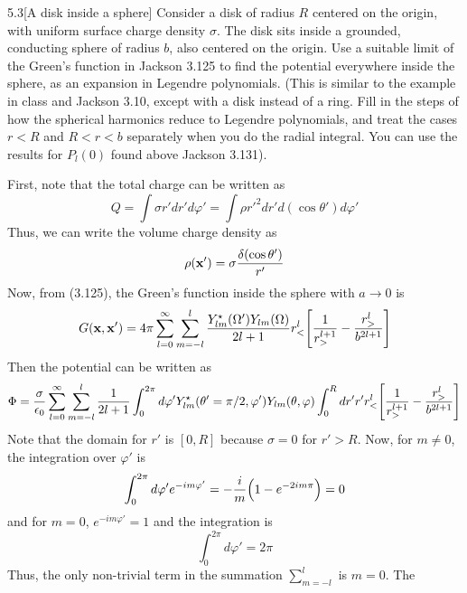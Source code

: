 \documentclass[12pt]{article}
\begin{document}
\begin{problem}{5.3}[A disk inside a sphere]
Consider a disk of radius $R$ centered on the origin, with uniform surface
charge density $\sigma$. The disk sits inside a grounded, conducting sphere of
radius $b$, also centered on the origin. Use a suitable limit of the Green's
function in Jackson 3.125 to find the potential everywhere inside the sphere, as
an expansion in Legendre polynomials. (This is similar to the example in class
and Jackson 3.10, except with a disk instead of a ring. Fill in the steps of how
the spherical harmonics reduce to Legendre polynomials, and treat the cases
$r<R$ and $R<r<b$ separately when you do the radial integral. You can use the
results for $P_l(0)$ found above Jackson 3.131).
\begin{solution}
First, note that the total charge can be written as
\begin{equation}
    Q=\int\sigma r'dr'd\varphi'=\int \rho
    r'^2dr'd(\cos\theta')d\varphi' 
\end{equation}
Thus, we can write the volume charge density as
\begin{equation}
    \rho(\vb{x}')=\sigma\frac{\delta(\cos\theta')}{r'} 
\end{equation}
Now, from (3.125), the Green's function inside the sphere with $a\to 0$ is
\begin{equation}
    G(\vb{x},\vb{x}')=4\pi\sum_{l=0}^\infty\sum_{m=-l}^l\frac{Y_{lm}^\star(\Omega')Y_{lm}(\Omega)}{2l+1}r_<^l\qty[\frac1{r_>^{l+1}}-\frac{r_>^l}{b^{2l+1}}]
\end{equation}
Then the potential can be written as
\begin{equation}\label{p3:Phi1}
    \Phi=\frac{\sigma}{\epsilon_0}\sum_{l=0}^\infty\sum_{m=-l}^l
    \frac1{2l+1}\int_0^{2\pi}d\varphi'Y_{lm}^\star(\theta'=\pi/2,\varphi')Y_{lm}(\theta,\varphi)\int_0^Rdr'r'r_<^l\qty[\frac1{r_>^{l+1}}-\frac{r_>^l}{b^{2l+1}}]
\end{equation}
Note that the domain for $r'$ is $[0,R]$ because $\sigma=0$ for $r'>R$. Now, for
$m\neq 0$, the integration over $\varphi'$ is
\begin{equation}
    \int_0^{2\pi}d\varphi' e^{-im\varphi'}=-\frac{i}{m}\qty(1-e^{-2im\pi})=0
\end{equation}
and for $m=0$, $e^{-im\varphi'}=1$ and the integration is
\begin{equation}\label{p3:int_phi}
    \int_0^{2\pi}d\varphi'=2\pi 
\end{equation}
Thus, the only non-trivial term in the summation $\sum_{m=-l}^l$ is $m=0$. The

\end{solution}
\end{problem}
\end{document}
